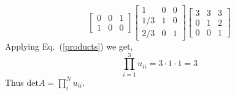 \begin{enumerate}[label=\arabic*.]
\begin{mdframed}[style=MyFrame]
\begin{equation}
\begin{bmatrix}
                    0   &   0   &   1   \\
                    1   &   0   &   0   
                \end{bmatrix}
                \begin{bmatrix}
                    1   &   0   &   0   \\
                    1/3 &   1   &   0   \\
                    2/3 &   0   &   1   
                \end{bmatrix}
                \begin{bmatrix}
                    3       &       3   &   3   \\
                    0       &       1   &   2   \\
                    0       &       0   &   1
                \end{bmatrix}
            \end{equation}
            Applying Eq.~(\ref{products}) we get,
            \begin{equation}
                \prod_{i=1}^{3} u_{ii}
                =
                3   \cdot 1 \cdot 1 = 3
            \end{equation}
            Thus $\text{det}A = \prod_{i}^{N}u_{ii}$.
        \end{mdframed}



\end{enumerate}

